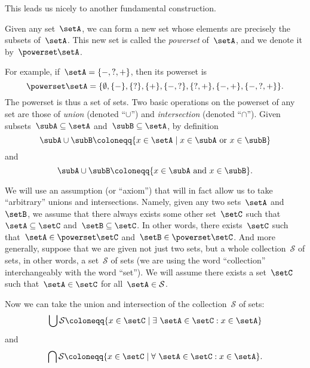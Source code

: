 This leads us nicely to another fundamental construction.

\begin{definition}\label{def:power-set}
Given any set~$\setA$, we can form a new set whose elements are precisely the subsets of~$\setA$.
This new set is called the \emph{powerset} of~$\setA$, and we denote it by~$\powerset \setA$.
\end{definition}

For example, if~$\setA = \{ -, ?, + \}$, then its powerset is
\begin{equation*}
\powerset \setA = \{ \emptyset, \{ - \}, \{ ? \}, \{ + \}, \{ -, ? \}, \{ ?, + \}, \{ -, +\}, \{ -, ?, + \} \}.
\end{equation*}
The powerset is thus a set of sets.
Two basic operations on the powerset of any set are those of \emph{union} (denoted ``$\cup$'') and \emph{intersection} (denoted ``$\cap$'').
Given subsets~$\subA \subseteq \setA$ and~$\subB \subseteq \setA$, by definition
\begin{equation*}
\subA \cup \subB \coloneqq \{ x \in \setA \mid x \in \subA \text{ or } x \in \subB \}
\end{equation*}
and
\begin{equation*}
\subA \cup \subB \coloneqq \{ x \in \subA \text{ and } x \in \subB \}.
\end{equation*}


We will use an assumption (or ``axiom'') that will in fact allow us to take ``arbitrary'' unions and intersections.
Namely, given any two sets~$\setA$ and~$\setB$, we assume that there always exists some other set~$\setC$ such that~$\setA \subseteq \setC$ and~$\setB \subseteq \setC$.
In other words, there exists~$\setC$ such that~$\setA \in \powerset \setC$ and~$\setB \in \powerset \setC$.
And more generally, suppose that we are given not just two sets, but a whole collection~$\mathcal{S}$ of sets, in other words, a set~$\mathcal{S}$ of sets (we are using the word ``collection'' interchangeably with the word ``set'').
We will assume there exists a set~$\setC$ such that~$\setA \in \setC$ for all~$\setA \in \mathcal{S}$.

Now we can take the union and intersection of the collection~$\mathcal{S}$ of sets:
\begin{equation*}
\bigcup \mathcal{S} \coloneqq \{ x \in \setC \mid \exists \  \setA \in \setC : x \in \setA \}
\end{equation*}
and
\begin{equation*}
\bigcap \mathcal{S} \coloneqq \{ x \in \setC \mid \forall \  \setA \in \setC : x \in \setA \}.
\end{equation*}

